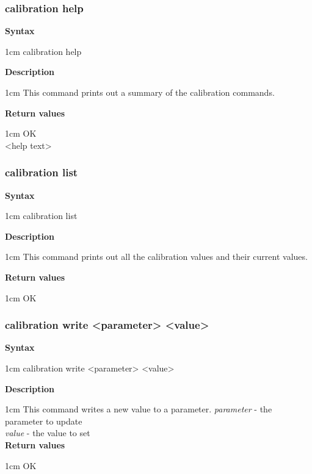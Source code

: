 \documentclass{article}[a4paper]
\begin{document}
\subsubsection{calibration help}
\begin{tcolorbox}
	{\bf Syntax}

	 1cm \dimexpr\linewidth-2cm\relax
	calibration help

	\medskip
	{\bf Description}

	 1cm \dimexpr\linewidth-2cm\relax
	This command prints out a summary of the calibration commands.

	\medskip
	{\bf Return values}

	 1cm \dimexpr\linewidth-2cm\relax
	OK \\
	<help text>
\end{tcolorbox}

\subsubsection{calibration list}
\begin{tcolorbox}
	{\bf Syntax}

	 1cm \dimexpr\linewidth-2cm\relax
	calibration list

	\medskip
	{\bf Description}

	 1cm \dimexpr\linewidth-2cm\relax
	This command prints out all the calibration values and their current values.

	\medskip
	{\bf Return values}

	 1cm \dimexpr\linewidth-2cm\relax
	OK
\end{tcolorbox}

\subsubsection{calibration write <parameter> <value>}
\begin{tcolorbox}
	{\bf Syntax}

	 1cm \dimexpr\linewidth-2cm\relax
	calibration write <parameter> <value>

	\medskip
	{\bf Description}

	 1cm \dimexpr\linewidth-2cm\relax
	This command writes a new value to a parameter.
	\medskip
	{\it parameter} - the parameter to update \\
	{\it value} - the value to set \\

	\medskip
	{\bf Return values}

	 1cm \dimexpr\linewidth-2cm\relax
	OK
\end{tcolorbox}
\end{document}
